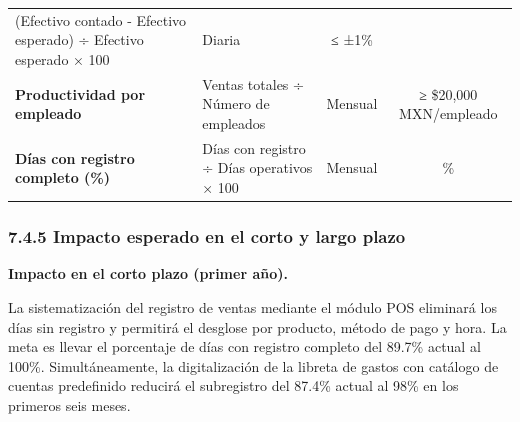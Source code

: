 \documentclass[
  12pt,
  spanish,
]{article}
\begin{document}
\begin{longtable}[]{@{}llcc@{}}
\begin{minipage}[t]{0.17\columnwidth}
(Efectivo contado - Efectivo esperado) ÷ Efectivo esperado × 100\strut
\end{minipage} & \begin{minipage}[t]{0.28\columnwidth}\centering
Diaria\strut
\end{minipage} & \begin{minipage}[t]{0.28\columnwidth}\centering
≤ ±1\%\strut
\end{minipage}\tabularnewline
\begin{minipage}[t]{0.17\columnwidth}\raggedright
\textbf{Productividad por empleado}\strut
\end{minipage} & \begin{minipage}[t]{0.17\columnwidth}\raggedright
Ventas totales ÷ Número de empleados\strut
\end{minipage} & \begin{minipage}[t]{0.28\columnwidth}\centering
Mensual\strut
\end{minipage} & \begin{minipage}[t]{0.28\columnwidth}\centering
≥ \$20,000 MXN/empleado\strut
\end{minipage}\tabularnewline
\begin{minipage}[t]{0.17\columnwidth}\raggedright
\textbf{Días con registro completo (\%)}\strut
\end{minipage} & \begin{minipage}[t]{0.17\columnwidth}\raggedright
Días con registro ÷ Días operativos × 100\strut
\end{minipage} & \begin{minipage}[t]{0.28\columnwidth}\centering
Mensual\strut
\end{minipage} & \begin{minipage}[t]{0.28\columnwidth}\centering
100\%\strut
\end{minipage}\tabularnewline
\bottomrule
\end{longtable}

\hypertarget{impacto-esperado-en-el-corto-y-largo-plazo}{%
\subsubsection{7.4.5 Impacto esperado en el corto y largo
plazo}\label{impacto-esperado-en-el-corto-y-largo-plazo}}

\textbf{Impacto en el corto plazo (primer año).}

La sistematización del registro de ventas mediante el módulo POS
eliminará los días sin registro y permitirá el desglose por producto,
método de pago y hora. La meta es llevar el porcentaje de días con
registro completo del 89.7\% actual al 100\%. Simultáneamente, la
digitalización de la libreta de gastos con catálogo de cuentas
predefinido reducirá el subregistro del 87.4\% actual al 98\% en los
primeros seis meses.
\end{document}
